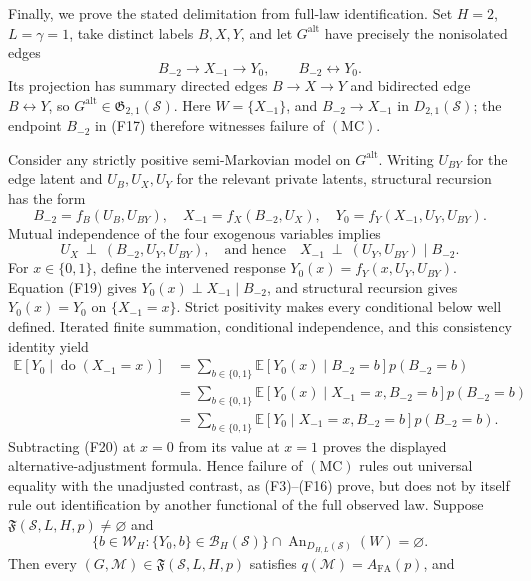 Finally, we prove the stated delimitation from full-law identification.  Set \(H=2\), \(L=\gamma=1\), take distinct labels \(B,X,Y\), and let \(G^{\mathrm{alt}}\) have precisely the nonisolated edges
\[
B_{-2}\to X_{-1}\to Y_0,
\qquad
B_{-2}\leftrightarrow Y_0.
\tag{F17}
\]
Its projection has summary directed edges \(B\to X\to Y\) and bidirected edge \(B\leftrightarrow Y\), so \(G^{\mathrm{alt}}\in\mathfrak G_{2,1}(\mathcal S)\).  Here \(W=\{X_{-1}\}\), and \(B_{-2}\to X_{-1}\) in \(D_{2,1}(\mathcal S)\); the endpoint \(B_{-2}\) in (F17) therefore witnesses failure of \(\mathrm{(MC)}\).

Consider any strictly positive semi-Markovian model on \(G^{\mathrm{alt}}\).  Writing \(U_{BY}\) for the edge latent and \(U_B,U_X,U_Y\) for the relevant private latents, structural recursion has the form
\[
B_{-2}=f_B(U_B,U_{BY}),
\quad
X_{-1}=f_X(B_{-2},U_X),
\quad
Y_0=f_Y(X_{-1},U_Y,U_{BY}).
\tag{F18}
\]
Mutual independence of the four exogenous variables implies
\[
U_X\ \perp\ (B_{-2},U_Y,U_{BY}),
\quad\text{and hence}\quad
X_{-1}\ \perp\ (U_Y,U_{BY})\mid B_{-2}.
\tag{F19}
\]
For \(x\in\{0,1\}\), define the intervened response \(Y_0(x)=f_Y(x,U_Y,U_{BY})\).  Equation (F19) gives \(Y_0(x)\perp X_{-1}\mid B_{-2}\), and structural recursion gives \(Y_0(x)=Y_0\) on \(\{X_{-1}=x\}\).  Strict positivity makes every conditional below well defined.  Iterated finite summation, conditional independence, and this consistency identity yield
\[
\begin{aligned}
\mathbb E[Y_0\mid\operatorname{do}(X_{-1}=x)]
&=\sum_{b\in\{0,1\}}\mathbb E[Y_0(x)\mid B_{-2}=b]p(B_{-2}=b)\\
&=\sum_{b\in\{0,1\}}\mathbb E[Y_0(x)\mid X_{-1}=x,B_{-2}=b]p(B_{-2}=b)\\
&=\sum_{b\in\{0,1\}}\mathbb E[Y_0\mid X_{-1}=x,B_{-2}=b]p(B_{-2}=b).
\end{aligned}
\tag{F20}
\]
Subtracting (F20) at \(x=0\) from its value at \(x=1\) proves the displayed alternative-adjustment formula.  Hence failure of \(\mathrm{(MC)}\) rules out universal equality with the unadjusted contrast, as (F3)--(F16) prove, but does not by itself rule out identification by another functional of the full observed law.
Suppose \(\mathfrak F(\mathcal S,L,H,p)\ne\varnothing\) and
\[
\bigl\{b\in\mathcal W_H:\{Y_0,b\}\in\mathcal B_H(\mathcal S)\bigr\}
\cap\operatorname{An}_{D_{H,L}(\mathcal S)}(W)=\varnothing.
\tag{MC}
\]
Then every \((G,\mathcal M)\in\mathfrak F(\mathcal S,L,H,p)\) satisfies \(q(\mathcal M)=A_{\mathrm{FA}}(p)\), and
